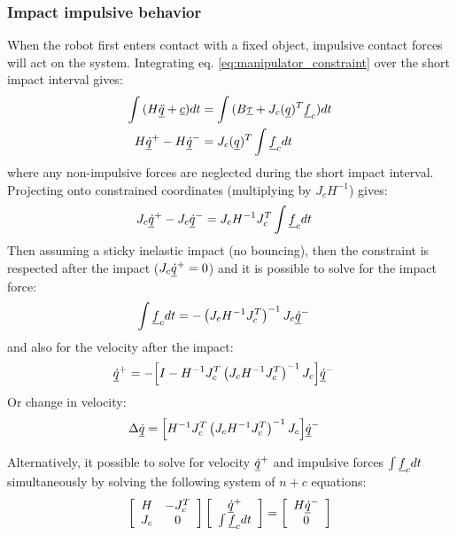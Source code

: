 \subsubsection{Impact impulsive behavior}
\label{sec:impact}
%
When the robot first enters contact with a fixed object, impulsive contact forces will act on the system. Integrating eq. \eqref{eq:manipulator_constraint} over the short impact interval gives:
%
\begin{align}
\int{ ( H \underline{\ddot{q}} + \underline{c} ) dt } &= \int{ ( B \underline{\tau} + J_c( \underline{ q } )^T  \underline{f}_c ) dt } \\
H \underline{\dot{q}}^+ - H \underline{\dot{q}}^- &= J_c( \underline{ q } )^T  \int{  \underline{f}_c dt }
\label{eq:manipulator_impact}
\end{align}
%
where any non-impulsive forces are neglected during the short impact interval. Projecting onto constrained coordinates (multiplying by $J_c H^{-1}$) gives:
%
\begin{align}
J_c \underline{\dot{q}}^+ - J_c \underline{\dot{q}}^- &= J_c H^{-1} J_c^T  \int{  \underline{f}_c dt }
\label{eq:manipulator_impact2}
\end{align}
%
Then assuming a sticky inelastic impact (no bouncing), then the constraint is respected after the impact ($J_c \underline{\dot{q}}^+=0$) and it is possible to solve for the impact force:
%
\begin{align}
\int{  \underline{f}_c dt } &= - \left( J_c H^{-1} J_c^T \right)^{-1}  J_c \underline{\dot{q}}^-
\label{eq:manipulator_impact_force}
\end{align}
%
and also for the velocity after the impact:
%
\begin{align}
\underline{\dot{q}}^+ &= - \Big[ I - H^{-1} J_c^T \left( J_c H^{-1} J_c^T \right)^{-1} J_c \Big] \underline{\dot{q}}^-
\label{eq:manipulator_impact_velocity}
\end{align}
%
Or change in velocity:
%
\begin{align}
\Delta \underline{\dot{q}} &=  \Big[ H^{-1} J_c^T \left( J_c H^{-1} J_c^T \right)^{-1} J_c \Big] \underline{\dot{q}}^-
\label{eq:manipulator_impact_velocity_delta}
\end{align}
%

Alternatively, it possible to solve for velocity $\underline{\dot{q}}^+$ and impulsive forces $\int{ \underline{f}_c dt }$ simultaneously by solving the following system of $n+c$ equations:
%
\begin{align}
\left[ \begin{array}{c c } 	H & -J_c^T  \\ J_c 	& 0  	\end{array} \right] \left[ \begin{array}{c} \underline{\dot{q}}^+  \\ \int{ \underline{f}_c dt }\end{array} \right] = \left[ \begin{array}{c}  	H \underline{\dot{q}}^-   \\ 0  \end{array} \right]
\label{eq:manipulator_impact_eom}
\end{align}

